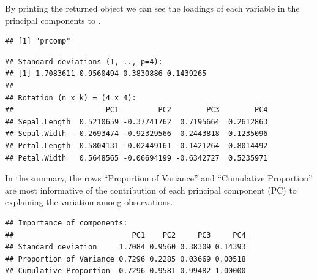 \documentclass[krantz2]{krantz}\usepackage{knitr}
\begin{document}
\begin{knitrout}\footnotesize
{}\color{fgcolor}\begin{kframe}
\begin{alltt}
 \hlkwb{<-} \hlstd{(iris[}\hlstd{(}\hlstd{,} \hlstd{,}
                    \hlstd{,} \hlstd{)],}
              \hlstd{=} \hlstd{,}
              \hlstd{=} \hlstd{)}
\end{alltt}
\end{kframe}
\end{knitrout}

By printing the returned object we can see the loadings of each variable in the principal components  to .
\begin{knitrout}\footnotesize
{}\color{fgcolor}\begin{kframe}
\begin{alltt}
\end{alltt}
\begin{verbatim}
## [1] "prcomp"
\end{verbatim}
\begin{alltt}
\end{alltt}
\begin{verbatim}
## Standard deviations (1, .., p=4):
## [1] 1.7083611 0.9560494 0.3830886 0.1439265
## 
## Rotation (n x k) = (4 x 4):
##                     PC1         PC2        PC3        PC4
## Sepal.Length  0.5210659 -0.37741762  0.7195664  0.2612863
## Sepal.Width  -0.2693474 -0.92329566 -0.2443818 -0.1235096
## Petal.Length  0.5804131 -0.02449161 -0.1421264 -0.8014492
## Petal.Width   0.5648565 -0.06694199 -0.6342727  0.5235971
\end{verbatim}
\end{kframe}
\end{knitrout}

In the summary, the rows ``Proportion of Variance'' and ``Cumulative Proportion'' are most informative of the contribution of each principal component (PC) to explaining the variation among observations.

\begin{knitrout}\footnotesize
{}\color{fgcolor}\begin{kframe}
\begin{alltt}
\end{alltt}
\begin{verbatim}
## Importance of components:
##                           PC1    PC2     PC3     PC4
## Standard deviation     1.7084 0.9560 0.38309 0.14393
## Proportion of Variance 0.7296 0.2285 0.03669 0.00518
## Cumulative Proportion  0.7296 0.9581 0.99482 1.00000
\end{verbatim}
\end{kframe}
\end{knitrout}
\end{document}
